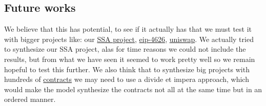 \documentclass{article}
\begin{document}
\subsection{Future works}
We believe that this has potential, to see if it actually has that we must test it with bigger projects like: our 
\href{https://github.com/BobTheBot988/sec_proj/tree/master}{SSA project}, \href{https://eips.ethereum.org/EIPS/eip-4626}{eip-4626}, \href{https://github.com/Uniswap/v4-core}{uniswap}.
We actually tried to synthesize our SSA project, alas for time reasons we could not include the results, but from what we have seen it seemed 
to work pretty well so we remain hopeful to test this further.
We also think that to synthesize big projects with hundreds of \href{https://docs.soliditylang.org/en/latest/contracts.html}{contracts} we may need to use a divide et impera approach,
which would make the model synthesize the contracts not all at the same time but in an ordered manner.


\pagebreak


\end{document}
